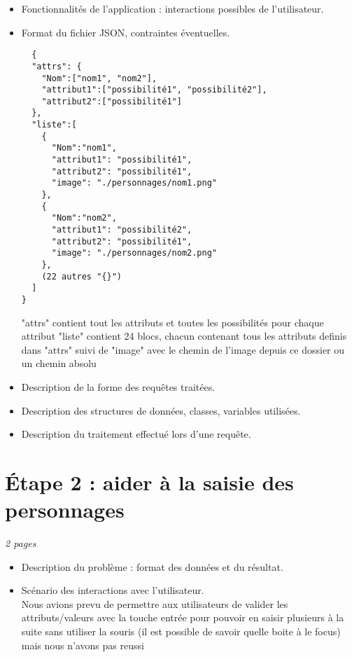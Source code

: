 \documentclass[a4paper]{article}
\begin{document}
\begin{itemize}         
\item
  Fonctionnalités de l'application : interactions possibles de
  l'utilisateur.
\item
  Format du fichier JSON, contraintes éventuelles.\\
  \begin{verbatim}
  {
  "attrs": {
  	"Nom":["nom1", "nom2"], 
  	"attribut1":["possibilité1", "possibilité2"],
  	"attribut2":["possibilité1"]
  },
  "liste":[
    {
      "Nom":"nom1",
      "attribut1": "possibilité1",
      "attribut2": "possibilité1",
      "image": "./personnages/nom1.png"
    },
    {
      "Nom":"nom2",
      "attribut1": "possibilité2",
      "attribut2": "possibilité1",
      "image": "./personnages/nom2.png"
    },
    (22 autres "{}")
  ]
}

\end{verbatim}
 "attrs" contient tout les attributs et toutes les possibilités pour chaque attribut "liste" contient 24 blocs, chacun contenant tous les attributs definis dans "attrs" suivi de "image" avec le chemin de l'image depuis ce dossier ou un chemin absolu
\newline
\item
  Description de la forme des requêtes traitées.
\item
  Description des structures de données, classes, variables utilisées.
\item
  Description du traitement effectué lors d'une requête.
\end{itemize}


\section{Étape 2 : aider  à la saisie  des personnages}

\emph{2 pages}

\begin{itemize}    
\item
  Description du problème : format des données et du résultat.
\item
  Scénario des interactions avec l'utilisateur.\\
  Nous avions prevu de permettre aux utilisateurs de valider les attributs/valeurs avec la touche entrée pour pouvoir en saisir plusieurs à la suite sans utiliser la souris (il est possible de savoir quelle boite à le focus) mais nous n'avons pas reussi
\end{itemize}
\end{document}
